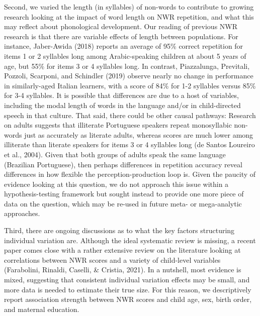 \documentclass[english,,man,floatsintext]{apa6}
\begin{document}
Second, we varied the length (in syllables) of non-words to contribute to growing research looking at the impact of word length on NWR repetition, and what this may reflect about phonological development. Our reading of previous NWR research is that there are variable effects of length between populations. For instance, Jaber-Awida (2018) reports an average of 95\% correct repetition for items 1 or 2 syllables long among Arabic-speaking children at about 5 years of age, but 55\% for items 3 or 4 syllables long. In contrast, Piazzalunga, Previtali, Pozzoli, Scarponi, and Schindler (2019) observe nearly no change in performance in similarly-aged Italian learners, with a score of 84\% for 1-2 syllables versus 85\% for 3-4 syllables. It is possible that differences are due to a host of variables, including the modal length of words in the language and/or in child-directed speech in that culture. That said, there could be other causal pathways: Research on adults suggests that illiterate Portuguese speakers repeat monosyllabic non-words just as accurately as literate adults, whereas scores are much lower among illiterate than literate speakers for items 3 or 4 syllables long (de Santos Loureiro et al., 2004). Given that both groups of adults speak the same language (Brazilian Portuguese), then perhaps differences in repetition accuracy reveal differences in how flexible the perception-production loop is. Given the paucity of evidence looking at this question, we do not approach this issue within a hypothesis-testing framework but sought instead to provide one more piece of data on the question, which may be re-used in future meta- or mega-analytic approaches.

Third, there are ongoing discussions as to what the key factors structuring individual variation are. Although the ideal systematic review is missing, a recent paper comes close with a rather extensive review on the literature looking at correlations between NWR scores and a variety of child-level variables (Farabolini, Rinaldi, Caselli, \& Cristia, 2021). In a nutshell, most evidence is mixed, suggesting that consistent individual variation effects may be small, and more data is needed to estimate their true size. For this reason, we descriptively report association strength between NWR scores and child age, sex, birth order, and maternal education.
\end{document}
